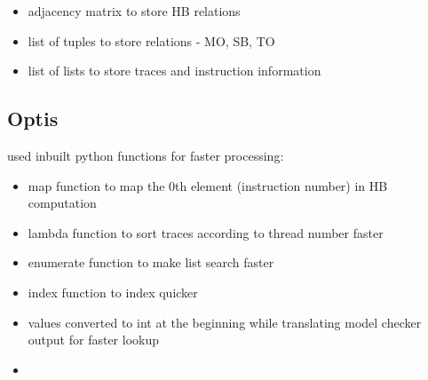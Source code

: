 \begin{itemize}
	\item adjacency matrix to store HB relations
	\item list of tuples to store relations - MO, SB, TO
	\item list of lists to store traces and instruction information
\end{itemize}

\subsection{Optis}
used inbuilt python functions for faster processing:
\begin{itemize}
	\item map function to map the 0th element (instruction number) in HB computation
	\item lambda function to sort traces according to thread number faster
	\item enumerate function to make list search faster
	\item index function to index quicker
	\item values converted to int at the beginning while translating model checker output for faster lookup
	\item 
\end{itemize}

